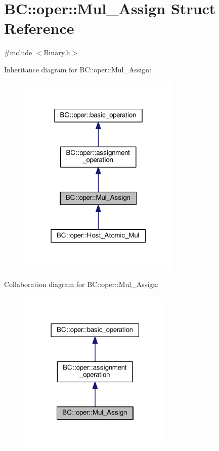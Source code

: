 \hypertarget{structBC_1_1oper_1_1Mul__Assign}{}\section{BC\+:\+:oper\+:\+:Mul\+\_\+\+Assign Struct Reference}
\label{structBC_1_1oper_1_1Mul__Assign}


{\ttfamily \#include $<$Binary.\+h$>$}



Inheritance diagram for BC\+:\+:oper\+:\+:Mul\+\_\+\+Assign\+:
\nopagebreak
\begin{figure}[H]
\begin{center}
\leavevmode
\includegraphics[width=220pt]{structBC_1_1oper_1_1Mul__Assign__inherit__graph}
\end{center}
\end{figure}


Collaboration diagram for BC\+:\+:oper\+:\+:Mul\+\_\+\+Assign\+:
\nopagebreak
\begin{figure}[H]
\begin{center}
\leavevmode
\includegraphics[width=210pt]{structBC_1_1oper_1_1Mul__Assign__coll__graph}
\end{center}
\end{figure}
